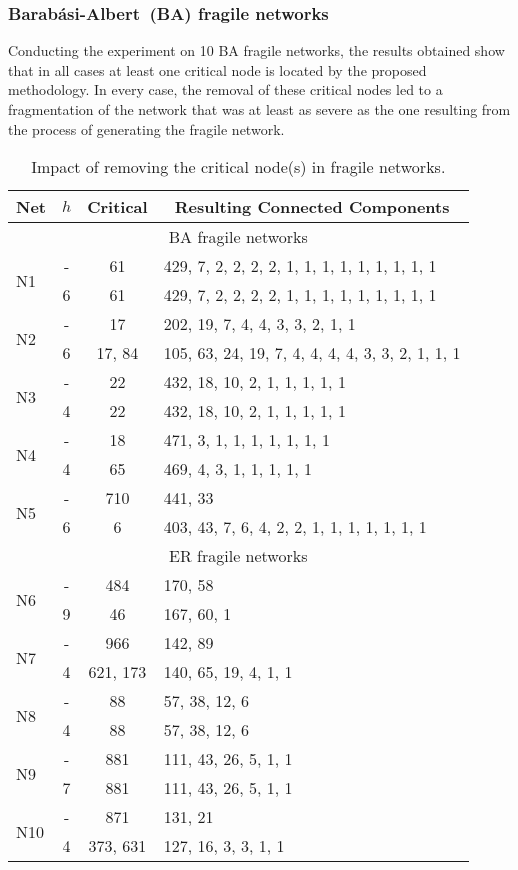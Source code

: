 \documentclass[conference,fleqn]{IEEEtran}
\begin{document}
\subsubsection{Barab\'{a}si-Albert~(BA) fragile networks}
Conducting the experiment on 10 BA fragile networks, the results obtained show that in all cases at least one critical node is
located by the proposed methodology. In every case, the removal of these critical nodes led to a fragmentation of the network that was at least
as severe as the one resulting from the process of generating the fragile network. 

\begin{table*}[ht]
\caption{Impact of removing the critical node(s) in fragile networks.}
\label{tab:fragile}
\begin{center}
\begin{tabular}{|l|c|c|l|}
\hline
Net  & $h$ & Critical & \multicolumn{1}{c|}{Resulting Connected Components} \\ \hline
\multicolumn{4}{c}{BA fragile networks} \\ \hline
\multirow{2}{2mm}{N1} & - & 61 & 429, 7, 2, 2, 2, 2, 1, 1, 1, 1, 1, 1, 1, 1, 1 \\ 
 & 6 & 61 & 429, 7, 2, 2, 2, 2, 1, 1, 1, 1, 1, 1, 1, 1, 1 \\ \hline
\multirow{2}{2mm}{N2}  & - & 17 & 202, 19, 7, 4, 4, 3, 3, 2, 1, 1 \\ 
 & 6 & 17, 84 & 105, 63, 24, 19, 7, 4, 4, 4, 4, 3, 3, 2, 1, 1, 1 \\ \hline
\multirow{2}{2mm}{N3} & - & 22 & 432, 18, 10, 2, 1, 1, 1, 1, 1 \\ 
 & 4 & 22 & 432, 18, 10, 2, 1, 1, 1, 1, 1 \\ \hline
\multirow{2}{2mm}{N4} & - & 18 & 471, 3, 1, 1, 1, 1, 1, 1, 1 \\ 
 & 4 & 65 & 469, 4, 3, 1, 1, 1, 1, 1 \\ \hline
\multirow{2}{2mm}{N5} & - & 710 & 441, 33 \\ 
 & 6 & 6 & 403, 43, 7, 6, 4, 2, 2, 1, 1, 1, 1, 1, 1, 1 \\ \hline
\multicolumn{4}{c}{ER fragile networks} \\ \hline
\multirow{2}{2mm}{N6} & - & 484 & 170, 58 \\ 
 & 9 & 46 & 167, 60, 1 \\ \hline
\multirow{2}{2mm}{N7} & - & 966 & 142, 89 \\ 
 & 4 & 621, 173 & 140, 65, 19, 4, 1, 1 \\ \hline
\multirow{2}{2mm}{N8} & - & 88 & 57, 38, 12, 6 \\ 
 & 4 & 88 & 57, 38, 12, 6 \\ \hline
\multirow{2}{2mm}{N9} & - & 881 & 111, 43, 26, 5, 1, 1 \\ 
 & 7 & 881 & 111, 43, 26, 5, 1, 1 \\\hline 
\multirow{2}{2mm}{N10} & - & 871 & 131, 21 \\ 
 & 4 & 373, 631 & 127, 16, 3, 3, 1, 1 \\ \hline
\end{tabular}
\end{center}
\end{table*}
\end{document}

